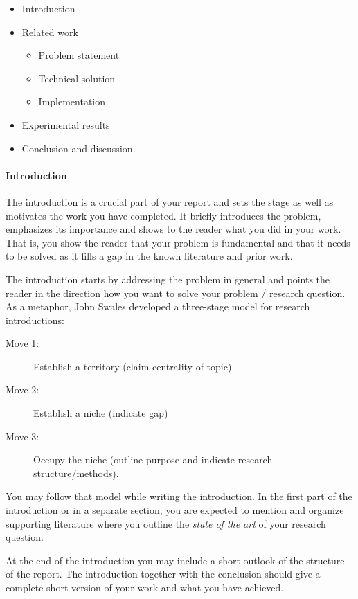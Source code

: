 \documentclass[11pt, a4paper,oneside,chapterprefix=false]{scrbook}
\begin{document}
\begin{itemize}
\item Introduction
\item Related work
\begin{itemize}
\item Problem statement
\item Technical solution
\item Implementation
\end{itemize}
\item Experimental results
\item Conclusion and discussion
\end{itemize}

\paragraph{Introduction}
The introduction is a crucial part of your report and sets the stage as well as motivates the work you have completed. It briefly introduces the problem, emphasizes its importance and shows to the reader what you did in your work. That is, you show the reader that your problem is fundamental and that it needs to be solved as it fills a gap in the known literature and prior work.

The introduction starts by addressing the problem in general and points the reader in the direction how you want to solve your problem / research question. As a metaphor, John Swales developed a three-stage model for research introductions: 

\begin{description}
\item[Move 1:] Establish a territory (claim centrality of topic)
\item[Move 2:] Establish a niche (indicate gap)
\item[Move 3:] Occupy the niche (outline purpose and indicate research structure/methods).
\end{description}

You may follow that model while writing the introduction. In the first part of the introduction or in a separate section, you are expected to mention and organize supporting literature where you outline the {\em state of the art} of your research question.

At the end of the introduction you may include a short outlook of the structure of the report. The introduction together with the conclusion should give a complete short version of your work and what you have achieved.
\end{document}
